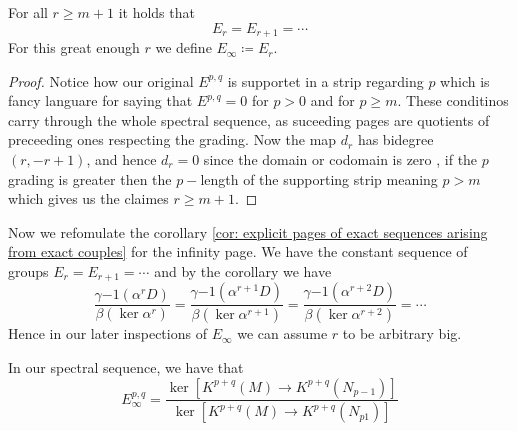 \begin{corollary}
	For all $r\geq m+1$ it holds that
	\begin{equation*}
		E_{r}=E_{r+1}=\cdots
	\end{equation*} For this great enough $r$ we define $E_{\infty}\coloneq E_{r}$.
\end{corollary}
\begin{proof}
	Notice how our original $E^{p,q}$ is supportet in a strip regarding $p$ which is fancy languare for saying that $E^{p,q}=0$ for $p>0$ and for $p\geq m$. These conditinos carry through the whole spectral sequence, as suceeding pages are quotients of preceeding ones respecting the grading. Now the map $d_r$ has bidegree $(r,-r+1)$, and hence $d_r=0$ since the domain or codomain is zero , if the $p$ grading is greater then the $p-$length of the supporting strip meaning $p>m$ which gives us the claimes $r\geq m+1$.
\end{proof}
Now we refomulate the corollary \ref{cor: explicit pages of exact sequences arising from exact couples} for the infinity page. We have the constant sequence of groups $E_r=E_{r+1}=\cdots$ and by the corollary we have
\begin{equation*}
	\frac{\gamma{-1}(\alpha^rD)}{\beta(\ker{\alpha^r})}=\frac{\gamma{-1}(\alpha^{r+1}D)}{\beta(\ker{\alpha^{r+1}})}=\frac{\gamma{-1}(\alpha^{r+2}D)}{\beta(\ker{\alpha^{r+2}})}=\cdots
\end{equation*}
Hence in our later inspections of $E_{\infty}$ we can assume $r$ to be arbitrary big.
\begin{lemma}
	In our spectral sequence, we have that
	\begin{equation*}
		E_{\infty}^{p,q}=\frac{\ker[K^{p+q}(M)\to K^{p+q}(N_{p-1})]}{\ker[K^{p+q}(M)\to K^{p+q}(N_{p1})]}
	\end{equation*}
\end{lemma}
